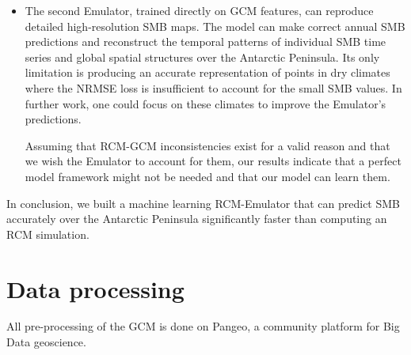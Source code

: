 \documentclass[a4paper,11pt,oneside]{report}
\begin{document}
\begin{itemize}
\begin{itemize}
        \item The second Emulator, trained directly on GCM features, can reproduce detailed high-resolution SMB maps. The model can make correct annual SMB predictions and reconstruct the temporal patterns of individual SMB time series and global spatial structures over the Antarctic Peninsula. Its only limitation is producing an accurate representation of points in dry climates where the NRMSE loss is insufficient to account for the small SMB values. In further work, one could focus on these climates to improve the Emulator's predictions. 
        
        Assuming that RCM-GCM inconsistencies exist for a valid reason and that we wish the Emulator to account for them, our results indicate that a perfect model framework might not be needed and that our model can learn them.  
    \end{itemize}
\end{itemize}
In conclusion, we built a machine learning RCM-Emulator that can predict SMB accurately over the Antarctic Peninsula significantly faster than computing an RCM simulation. 


\cleardoublepage
{}
{}
\printbibliography
\appendix

\chapter{Data processing}
All pre-processing of the GCM is done on Pangeo, a community platform for Big Data geoscience. 
\end{document}
